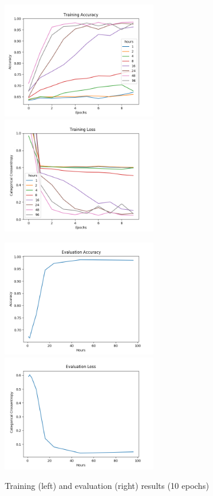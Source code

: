 \begin{figure}
      \begin{multicols}{2}
            \includegraphics[height=5cm]{img/control_condition/plot_acc_train.png}
            \includegraphics[height=5cm]{img/control_condition/plot_loss_train.png}

            \includegraphics[height=5cm]{img/control_condition/plot_acc_eval.png}
            \includegraphics[height=5cm]{img/control_condition/plot_loss_eval.png}
      \end{multicols}
      \caption{Training (left) and evaluation (right) results (10 epochs)}
      \label{figure:control_condition_10e}
\end{figure}

